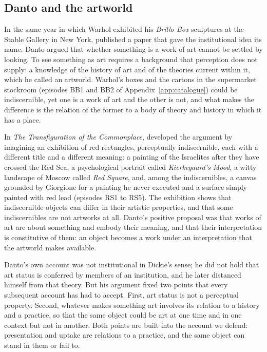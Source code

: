 \documentclass{situationist-preprint}
\begin{document}
\subsection{Danto and the artworld}

In the same year in which Warhol exhibited his \emph{Brillo Box} sculptures at the Stable Gallery in New York, \citet{Danto1964} published a paper that gave the institutional idea its name. Danto argued that whether something is a work of art cannot be settled by looking. To see something as art requires a background that perception does not supply: a knowledge of the history of art and of the theories current within it, which he called an artworld. Warhol's boxes and the cartons in the supermarket stockroom (episodes BB1 and BB2 of Appendix~\ref{app:catalogue}) could be indiscernible, yet one is a work of art and the other is not, and what makes the difference is the relation of the former to a body of theory and history in which it has a place.

In \emph{The Transfiguration of the Commonplace}, \citet{Danto1981} developed the argument by imagining an exhibition of red rectangles, perceptually indiscernible, each with a different title and a different meaning: a painting of the Israelites after they have crossed the Red Sea, a psychological portrait called \emph{Kierkegaard's Mood}, a witty landscape of Moscow called \emph{Red Square}, and, among the indiscernibles, a canvas grounded by Giorgione for a painting he never executed and a surface simply painted with red lead (episodes RS1 to RS5). The exhibition shows that indiscernible objects can differ in their artistic properties, and that some indiscernibles are not artworks at all. Danto's positive proposal was that works of art are about something and embody their meaning, and that their interpretation is constitutive of them: an object becomes a work under an interpretation that the artworld makes available.

Danto's own account was not institutional in Dickie's sense; he did not hold that art status is conferred by members of an institution, and he later distanced himself from that theory. But his argument fixed two points that every subsequent account has had to accept. First, art status is not a perceptual property. Second, whatever makes something art involves its relation to a history and a practice, so that the same object could be art at one time and in one context but not in another. Both points are built into the account we defend: presentation and uptake are relations to a practice, and the same object can stand in them or fail to.
\end{document}
